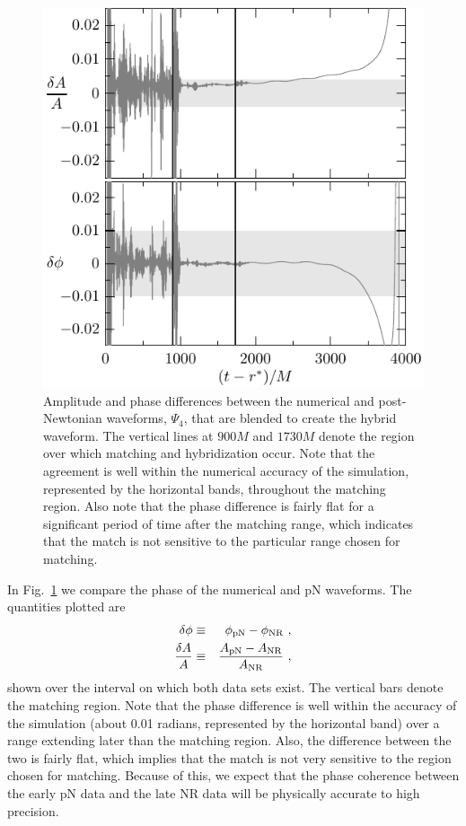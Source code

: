 \begin{figure}
  \begin{center}
    \includegraphics[width=0.55\linewidth]{figures/comparison/PlotDifferences}
  \end{center}
  \caption{Amplitude and phase differences between the numerical and
    post-Newtonian waveforms, $\Psi_4$, that are blended to create the
    hybrid waveform.  The vertical lines at $900M$ and $1730M$ denote
    the region over which matching and hybridization occur.  Note that
    the agreement is well within the numerical accuracy of the
    simulation, represented by the horizontal bands, throughout the
    matching region.  Also note that the phase difference is fairly
    flat for a significant period of time after the matching range,
    which indicates that the match is not sensitive to the particular
    range chosen for matching.}
  \label{fig:MatchingPhaseComparison}
\end{figure}%
In Fig.~\ref{fig:MatchingPhaseComparison} we compare the phase of the
numerical and pN waveforms.  The quantities plotted are
\begin{eqnarray}
  \delta \phi & \equiv & \phi_{\mathrm{pN}} - \phi_{\mathrm{NR}}\ , \\
  \frac{\delta A}{A} & \equiv & \frac{A_{\mathrm{pN}} - A_{\mathrm{NR}}}{A_{\mathrm{NR}}}\ , 
\end{eqnarray}
shown over the interval on which both data sets exist.  The vertical
bars denote the matching region.  Note that the phase difference is
well within the accuracy of the simulation (about 0.01 radians,
represented by the horizontal band) over a range extending later than
the matching region.  Also, the difference between the two is fairly
flat, which implies that the match is not very sensitive to the region
chosen for matching.  Because of this, we expect that the phase
coherence between the early pN data and the late NR data will be
physically accurate to high precision.

